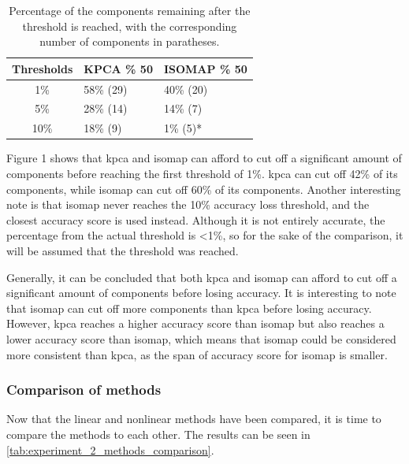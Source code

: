 \begin{table}[htb!]
    \centering
    \begin{tabular}{cp{}p{}}
        \toprule
        \textbf{Thresholds} & \textbf{KPCA \% 50} & \textbf{ISOMAP \% 50} \\
        \midrule
        1\%                 & 58\% (29)           & 40\% (20)             \\
        5\%                 & 28\% (14)           & 14\% (7)              \\
        10\%                & 18\% (9)            & 1\% (5)*              \\
        \bottomrule
    \end{tabular}
    \caption{Percentage of the components remaining after the threshold is reached, with the corresponding number of components in paratheses.}
    \label{tab:experiment_2_non_linear_methods_comparison}
\end{table}

Figure 1 shows that \gls{kpca} and \gls{isomap} can afford to cut off a significant amount of components before reaching the first threshold of 1\%. \gls{kpca} can cut off 42\% of its components, while \gls{isomap} can cut off 60\% of its components. Another interesting note is that \gls{isomap} never reaches the 10\% accuracy loss threshold, and the closest accuracy score is used instead. Although it is not entirely accurate, the percentage from the actual threshold is <1\%, so for the sake of the comparison, it will be assumed that the threshold was reached.

Generally, it can be concluded that both \gls{kpca} and \gls{isomap} can afford to cut off a significant amount of components before losing accuracy. It is interesting to note that \gls{isomap} can cut off more components than \gls{kpca} before losing accuracy. However, \gls{kpca} reaches a higher accuracy score than \gls{isomap} but also reaches a lower accuracy score than \gls{isomap}, which means that \gls{isomap} could be considered more consistent than kpca, as the span of accuracy score for \gls{isomap} is smaller.


\subsubsection{Comparison of methods}
Now that the linear and nonlinear methods have been compared, it is time to compare the methods to each other. The results can be seen in \autoref{tab:experiment_2_methods_comparison}.


